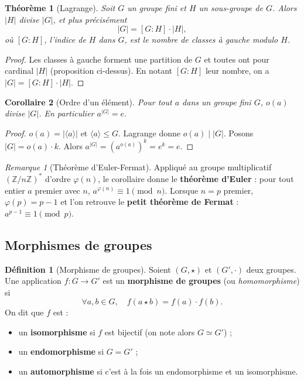\documentclass[12pt,a4paper]{report}
\newtheorem{theoreme}{Théorème}[section]
\newtheorem{corollaire}[theoreme]{Corollaire}
\theoremstyle{definition}
\newtheorem{definition}{Définition}[section]
\theoremstyle{remark}
\newtheorem{remarque}{Remarque}[section]
\begin{document}
\begin{theoreme}[Lagrange]
Soit $G$ un groupe \emph{fini} et $H$ un sous-groupe de $G$. Alors $|H|$ divise $|G|$, et plus précisément
\[ |G| = [G : H] \cdot |H|, \]
où $[G : H]$, l'\emph{indice} de $H$ dans $G$, est le nombre de classes à gauche modulo $H$.
\end{theoreme}

\begin{proof}
Les classes à gauche forment une partition de $G$ et toutes ont pour cardinal $|H|$ (proposition ci-dessus). En notant $[G : H]$ leur nombre, on a $|G| = [G : H] \cdot |H|$.
\end{proof}

\begin{corollaire}[Ordre d'un élément]
Pour tout $a$ dans un groupe fini $G$, $o(a)$ divise $|G|$. En particulier $a^{|G|} = e$.
\end{corollaire}

\begin{proof}
$o(a) = |\langle a \rangle|$ et $\langle a \rangle \le G$. Lagrange donne $o(a) \mid |G|$. Posons $|G| = o(a) \cdot k$. Alors $a^{|G|} = (a^{o(a)})^k = e^k = e$.
\end{proof}

\begin{remarque}[Théorème d'Euler-Fermat]
Appliqué au groupe multiplicatif $(\mathbb{Z}/n\mathbb{Z})^*$ d'ordre $\varphi(n)$, le corollaire donne le \textbf{théorème d'Euler} : pour tout entier $a$ premier avec $n$, $a^{\varphi(n)} \equiv 1 \pmod{n}$. Lorsque $n = p$ premier, $\varphi(p) = p-1$ et l'on retrouve le \textbf{petit théorème de Fermat} : $a^{p-1} \equiv 1 \pmod{p}$.
\end{remarque}

\subsection{Morphismes de groupes}

\begin{definition}[Morphisme de groupes]
Soient $(G, \star)$ et $(G', \cdot)$ deux groupes. Une application $f : G \to G'$ est un \textbf{morphisme de groupes} (ou \emph{homomorphisme}) si
\[ \forall a, b \in G,\quad f(a \star b) = f(a) \cdot f(b). \]
On dit que $f$ est :
\begin{itemize}
    \item un \textbf{isomorphisme} si $f$ est bijectif (on note alors $G \simeq G'$) ;
    \item un \textbf{endomorphisme} si $G = G'$ ;
    \item un \textbf{automorphisme} si c'est à la fois un endomorphisme et un isomorphisme.
\end{itemize}
\end{definition}
\end{document}
